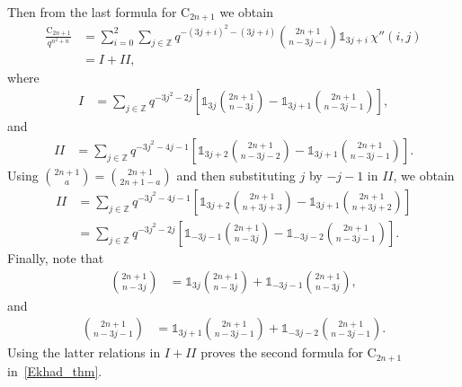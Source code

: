 \documentclass[12pt,a4paper,reqno]{amsart}
\theoremstyle{plain}
\theoremstyle{definition}
\newcommand{\ZZ}{{\mathbb{Z}}}
\newcommand{\1}{\mathds{1}}
\begin{document}
Then from the last formula for $\mathrm{C}_{2n+1}$ we obtain
\begin{align*}
\frac{\mathrm{C}_{2n+1}}{q^{n^2+n}}&=
\sum_{i=0}^2\sum_{j\in \ZZ}q^{-(3j+i)^2-(3j+i)}\binom{2n+1}{n-3j-i}\1_{3j+i}\, \chi''(i,j)
\\
&=I+II,
\end{align*}
where 
\begin{equation*}
\begin{split}
I&=\sum_{j\in \ZZ}q^{-3j^2-2j}\left[\1_{3j}\binom{2n+1}{n-3j}-\1_{3j+1}\binom{2n+1}{n-3j-1}\right],
\end{split}\end{equation*}
and
\begin{equation*}
    \begin{split}
II&=\sum_{j\in \ZZ}q^{-3j^2-4j-1}\left[\1_{3j+2}\binom{2n+1}{n-3j-2}-\1_{3j+1}\binom{2n+1}{n-3j-1}\right].
\end{split}
\end{equation*}
Using $\binom{2n+1}{a}=\binom{2n+1}{2n+1-a}$ and then substituting $j$ by  $-j-1$ in $II$, we obtain
\begin{equation*}
\begin{split}
    II&=\sum_{j\in \ZZ}q^{-3j^2-4j-1}\left[\1_{3j+2}\binom{2n+1}{n+3j+3}-\1_{3j+1}\binom{2n+1}{n+3j+2}\right]\\
    &=\sum_{j\in \ZZ}q^{-3j^2-2j}\left[\1_{-3j-1}\binom{2n+1}{n-3j}-\1_{-3j-2}\binom{2n+1}{n-3j-1}\right].
\end{split}
\end{equation*}
Finally, note that
\begin{equation*}
    \begin{split}
       \binom{2n+1}{n-3j}&= \1_{3j}\binom{2n+1}{n-3j}+\1_{-3j-1}\binom{2n+1}{n-3j},
    \end{split}
\end{equation*}
and
\begin{equation*}
    \begin{split}
        \binom{2n+1}{n-3j-1}&=\1_{3j+1}\binom{2n+1}{n-3j-1}+\1_{-3j-2}\binom{2n+1}{n-3j-1}.
    \end{split}
\end{equation*}
Using the latter relations in $I+II$ proves the second formula for $\mathrm{C}_{2n+1}$ in~\cref{Ekhad_thm}. 





\end{document}
